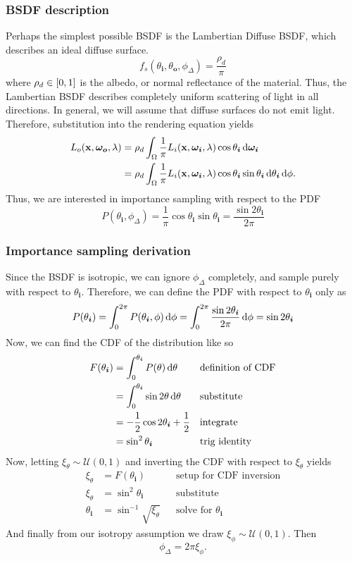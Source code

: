 \documentclass[12pt]{article}
\begin{document}
\subsubsection{BSDF description}
Perhaps the simplest possible BSDF is the Lambertian Diffuse BSDF, which describes an ideal diffuse surface.
\[f_s(\theta_{\bm i}, \theta_{\bm o}, \phi_\Delta) = \frac{\rho_d}{\pi}\]
where \(\rho_d \in \intcc{0,1}\) is the albedo, or normal reflectance of the material.
Thus, the Lambertian BSDF describes completely uniform scattering of light in all directions.
In general, we will assume that diffuse surfaces do not emit light.
Therefore, substitution into the rendering equation yields
\begin{align*}
  L_{o}(\mathbf x, \bm {\omega_{o}}, \lambda)
  &= \rho_d \int_\Omega \frac{1}{\pi} L_i(\mathbf x, \bm{\omega_i}, \lambda)\cos\theta_{\bm i} \dif \bm{\omega_i}\\
  &= \rho_d \int_\Omega \frac{1}{\pi} L_i(\mathbf x, \bm{\omega_i}, \lambda)\cos\theta_{\bm i} \sin\theta_{\bm i}\dif \theta_{\bm i} \dif \phi.
\end{align*}
Thus, we are interested in importance sampling with respect to the PDF
\[P(\theta_{\bm i}, \phi_\Delta) = \frac{1}{\pi}\cos \theta_{\bm i}\sin \theta_{\bm i} = \frac{\sin 2\theta_{\bm i}}{2\pi}\]
\subsubsection{Importance sampling derivation}
Since the BSDF is isotropic, we can ignore \(\phi_\Delta\) completely, and sample purely with respect to \(\theta_{\bm i}\).
Therefore, we can define the PDF with respect to \(\theta_{\bm i}\) only as
\[P(\theta_{\bm i}) = \int_0^{2\pi} P(\theta_{\bm i}, \phi)\dif \phi = \int_0^{2\pi} \frac{\sin 2\theta_{\bm i}}{2\pi} \dif \phi = \sin 2\theta_{\bm i}\]
Now, we can find the CDF of the distribution like so
\begin{align*}
  F(\theta_{\bm i})
  &= \int_0^{\theta_{\bm i}} P(\theta) \dif \theta && \text{definition of CDF}\\
  &= \int_0^{\theta_{\bm i}} \sin 2\theta \dif \theta && \text{substitute}\\
  &= -\frac{1}{2}\cos 2\theta_{\bm i} + \frac{1}{2} && \text{integrate}\\
  &= \sin^2 \theta_{\bm i} && \text{trig identity}
\end{align*}
Now, letting \(\xi_\theta \sim \mathcal{U}(0, 1)\) and inverting the CDF with respect to \(\xi_\theta\) yields
\begin{align*}
  \xi_\theta &= F(\theta_{\bm i}) && \text{setup for CDF inversion}\\
  \xi_\theta &= \sin^2 \theta_{\bm i} && \text{substitute}\\
  \theta_{\bm i} &= \sin^{-1}\sqrt{\xi_\theta} && \text{solve for \(\theta_{\bm i}\)}
\end{align*}
And finally from our isotropy assumption we draw \(\xi_\phi \sim \mathcal{U}(0, 1)\).
Then
\[\phi_\Delta = 2\pi\xi_\phi .\]
\end{document}
